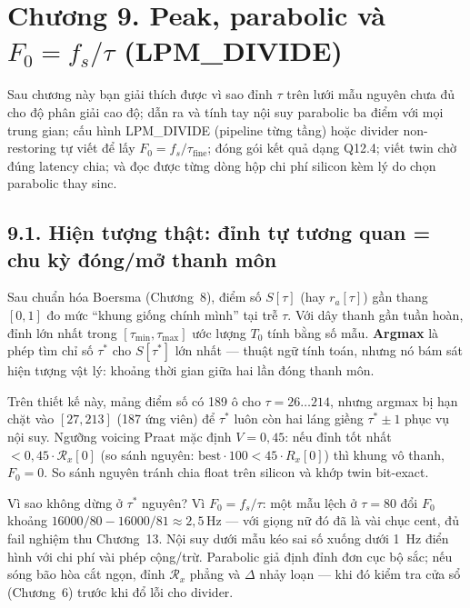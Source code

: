 \clearpage
{}
\section*{Chương 9. Peak, parabolic và $F_0=f_s/\tau$ (LPM\_DIVIDE)}

\begin{learningobj}
Sau chương này bạn giải thích được vì sao đỉnh $\tau$ trên lưới mẫu nguyên chưa đủ cho độ phân giải cao độ; dẫn ra và tính tay nội suy parabolic ba điểm với mọi trung gian; cấu hình LPM\_DIVIDE (pipeline từng tầng) hoặc divider non-restoring tự viết để lấy $F_0 = f_s/\tau_{\mathrm{fine}}$; đóng gói kết quả dạng Q12.4; viết twin chờ đúng latency chia; và đọc được từng dòng hộp chi phí silicon kèm lý do chọn parabolic thay sinc.
\end{learningobj}

\subsection*{9.1. Hiện tượng thật: đỉnh tự tương quan = chu kỳ đóng/mở thanh môn}

Sau chuẩn hóa Boersma (Chương~8), điểm số $S[\tau]$ (hay $r_a[\tau]$) gần thang $[0,1]$ đo mức ``khung giống chính mình'' tại trễ $\tau$. Với dây thanh gần tuần hoàn, đỉnh lớn nhất trong $[\tau_{\min},\tau_{\max}]$ ước lượng $T_0$ tính bằng số mẫu. \textbf{Argmax} là phép tìm chỉ số $\tau^*$ cho $S[\tau^*]$ lớn nhất --- thuật ngữ tính toán, nhưng nó bám sát hiện tượng vật lý: khoảng thời gian giữa hai lần đóng thanh môn.

Trên thiết kế này, mảng điểm số có 189 ô cho $\tau = 26\ldots 214$, nhưng argmax bị hạn chặt vào $[27,213]$ (187 ứng viên) để $\tau^*$ luôn còn hai láng giềng $\tau^*\pm 1$ phục vụ nội suy. Ngưỡng voicing Praat mặc định $V = 0{,}45$: nếu đỉnh tốt nhất $< 0{,}45\cdot\mathcal{R}_x[0]$ (so sánh nguyên: $\mathrm{best}\cdot 100 < 45\cdot R_x[0]$) thì khung vô thanh, $F_0 = 0$. So sánh nguyên tránh chia float trên silicon và khớp twin bit-exact.

Vì sao không dừng ở $\tau^*$ nguyên? Vì $F_0 = f_s/\tau$: một mẫu lệch ở $\tau=80$ đổi $F_0$ khoảng $16000/80 - 16000/81 \approx 2{,}5\,\text{Hz}$ --- với giọng nữ đó đã là vài chục cent, đủ fail nghiệm thu Chương~13. Nội suy dưới mẫu kéo sai số xuống dưới 1~Hz điển hình với chi phí vài phép cộng/trừ. Parabolic giả định đỉnh đơn cục bộ sắc; nếu sóng bão hòa cắt ngọn, đỉnh $\mathcal{R}_x$ phẳng và $\Delta$ nhảy loạn --- khi đó kiểm tra cửa sổ (Chương~6) trước khi đổ lỗi cho divider.

